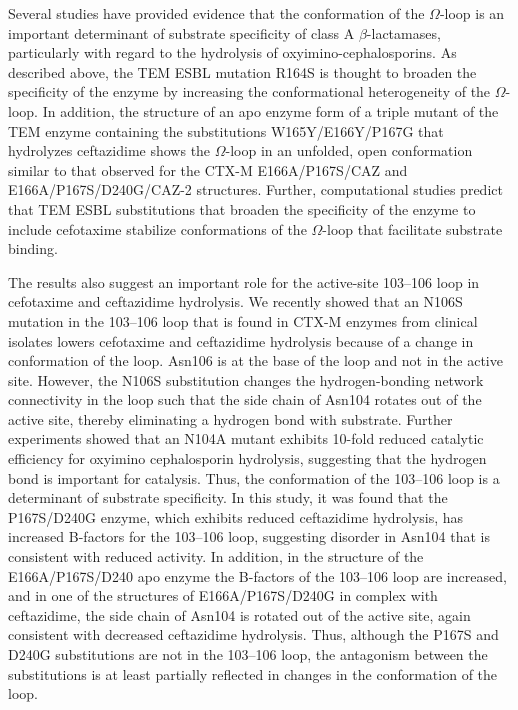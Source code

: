 \documentclass[../main.tex]{subfiles}
\begin{document}
        Several studies have provided evidence that the conformation of the $\Omega$-loop is an important determinant of substrate specificity of class A $\beta$-lactamases, particularly with regard to the hydrolysis of oxyimino-cephalosporins. As described above, the TEM ESBL mutation R164S is thought to broaden the specificity of the enzyme by increasing the conformational heterogeneity of the $\Omega$-loop\cite{dellus-gur_negative_2015}. In addition, the structure of an apo enzyme form of a triple mutant of the TEM enzyme containing the substitutions W165Y/E166Y/P167G that hydrolyzes ceftazidime shows the $\Omega$-loop in an unfolded, open conformation similar to that observed for the CTX-M E166A/P167S/CAZ and E166A/P167S/D240G/CAZ-2 structures\cite{stojanoski_triple_2015}. Further, computational studies predict that TEM ESBL substitutions that broaden the specificity of the enzyme to include cefotaxime stabilize conformations of the $\Omega$-loop that facilitate substrate binding\cite{Hart:2016kb}.

        The results also suggest an important role for the active-site 103–106 loop in cefotaxime and ceftazidime hydrolysis. We recently showed that an N106S mutation in the 103–106 loop that is found in CTX-M enzymes from clinical isolates lowers cefotaxime and ceftazidime hydrolysis because of a change in conformation of the loop\cite{patel_synergistic_2018}. Asn106 is at the base of the loop and not in the active site. However, the N106S substitution changes the hydrogen-bonding network connectivity in the loop such that the side chain of Asn104 rotates out of the active site, thereby eliminating a hydrogen bond with substrate. Further experiments showed that an N104A mutant exhibits 10-fold reduced catalytic efficiency for oxyimino cephalosporin hydrolysis, suggesting that the hydrogen bond is important for catalysis. Thus, the conformation of the 103–106 loop is a determinant of substrate specificity\cite{patel_synergistic_2018}. In this study, it was found that the P167S/D240G enzyme, which exhibits reduced ceftazidime hydrolysis, has increased B-factors for the 103–106 loop, suggesting disorder in Asn104 that is consistent with reduced activity. In addition, in the structure of the E166A/P167S/D240 apo enzyme the B-factors of the 103–106 loop are increased, and in one of the structures of E166A/P167S/D240G in complex with ceftazidime, the side chain of Asn104 is rotated out of the active site, again consistent with decreased ceftazidime hydrolysis. Thus, although the P167S and D240G substitutions are not in the 103–106 loop, the antagonism between the substitutions is at least partially reflected in changes in the conformation of the loop.
\end{document}
